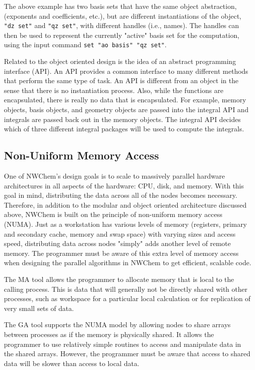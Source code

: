 The above example has two basis sets that have the same object abstraction,
(exponents and coefficients, etc.), but are different instantiations of
the object, \verb+"dz set"+ and \verb+"qz set"+, with different handles (i.e., names).
The handles can then be used to represent the currently "active" basis set for
the computation, using the input command
\verb+set "ao basis" "qz set"+.

Related to the object oriented design is the idea of an abstract programming
interface (API).  An API provides a common interface to many different
methods that perform the same type of task.  An API is different from an
object in the sense that there is no instantiation process.  Also, while the
functions are encapsulated, there is really no data that is encapsulated.
For example, memory objects, basis objects, and geometry objects are
passed into the integral API and integrals are passed back out in the
memory objects.  The integral API decides which of three different
integral packages will be used to compute the integrals.

\subsection{Non-Uniform Memory Access}

One of NWChem's design goals is to scale to massively parallel
hardware architectures in all aspects of the hardware: CPU, disk,
and memory.  With this goal in mind, distributing the data across
all of the nodes becomes necessary.
Therefore, in addition to the modular and object oriented architecture discussed
above, NWChem is built on the principle of non-uniform memory access (NUMA).
Just as a workstation has various levels of memory (registers, primary
and secondary cache, memory and swap space) with varying sizes and access
speed, distributing data across
nodes "simply" adds another level of remote memory.  The
programmer must be aware of this extra level of memory access when
designing the parallel algorithms in NWChem to get efficient, scalable
code.

The MA tool allows the programmer to allocate memory that is local to
the calling process.  This is data that will generally not be directly
shared with other processes, such as workspace for a particular local
calculation or for replication of very small sets of data.

The GA tool supports the NUMA model by allowing nodes to share arrays between
processes as if the memory is physically shared.  It allows the
programmer to use relatively simple routines to access and manipulate
data in the shared arrays.  However, the programmer must 
be aware that access to shared data will be slower than access
to local data.

